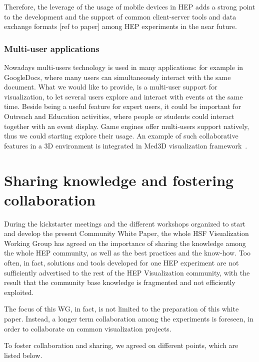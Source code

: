 \documentclass[12pt,a4paper]{article}
\begin{document}
Therefore, the leverage of the usage of mobile devices in HEP adds a strong point to the development and the support of common
client-server tools and data exchange formats [ref to paper] among HEP experiments in the near future.




\hypertarget{multi-user}{%
\subsubsection{Multi-user applications}\label{multi-user}}

Nowadays multi-users technology is used in many applications: for example in GoogleDocs, where many users can simultaneously
interact with the same document. What we would like to provide, is a multi-user support for visualization, to let several users
explore and interact with events at the same time. Beside being a useful feature for expert users, it could be important for
Outreach and Education activities, where people or students could interact together with an event display.
Game engines offer multi-users support natively, thus we could starting explore their usage.
An example of such collaborative features in a 3D environment is integrated in Med3D visualization framework~\cite{Bohak2017}.

\hypertarget{sharing-knowledge}{%
\section{Sharing knowledge and fostering collaboration}\label{sharing-knowledge}}

During the kickstarter meetings and the different workshops organized to start and develop the present Community White Paper,
the whole HSF Visualization Working Group has agreed on the importance of sharing the knowledge among the whole HEP community,
as well as the best practices and the know-how. Too often, in fact, solutions and tools developed for one HEP experiment are
not sufficiently advertised to the rest of the HEP Visualization community, with the result that the community base knowledge
is fragmented and not efficiently exploited.

The focus of this WG, in fact, is not limited to the preparation of this white paper. Instead, a longer term collaboration
among the experiments is foreseen, in order to collaborate on common visualization projects.

To foster collaboration and sharing, we agreed on different points, which are listed below.
\end{document}
